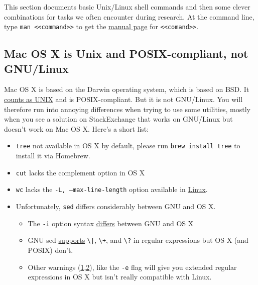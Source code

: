 \label{entry:unixshelltips}

This section documents basic Unix/Linux shell commands and then some clever combinations for tasks we often encounter during research.
At the command line, type \texttt{man <<command>>} to get the \href{https://en.wikipedia.org/wiki/Man_page}{manual page} for \texttt{<<comand>>}.

\subsection{Mac OS X is Unix and POSIX-compliant, not GNU/Linux}

Mac OS X is based on the Darwin operating system, which is based on BSD.
It \href{https://www.opengroup.org/openbrand/register/apple.htm}{counts as UNIX} and is POSIX-compliant.
But it is not GNU/Linux.
You will therefore run into annoying differences when trying to use some utilities, mostly when you see a solution on StackExchange that works on GNU/Linux but doesn't work on Mac OS X.
Here's a short list:
\begin{itemize}
\item \texttt{tree} not available in OS X by default, please run \texttt{brew install tree} to install it via Homebrew.
\item \texttt{cut} lacks the complement option in OS X
\item \texttt{wc} lacks the \texttt{-L, --max-line-length} option available in \href{https://linux.die.net/man/1/wc}{Linux}.
\item Unfortunately, \texttt{sed} differs considerably between GNU and OS X.
\begin{itemize}
	\item The \texttt{-i} option syntax \href{https://stackoverflow.com/questions/2320564/i-need-my-sed-i-command-for-in-place-editing-to-work-with-both-gnu-sed-and-bsd}{differs} between GNU and OS X
	\item GNU sed \href{https://unix.stackexchange.com/questions/13711/differences-between-sed-on-mac-osx-and-other-standard-sed}{supports} \texttt{\textbackslash|}, \texttt{\textbackslash+}, and \texttt{\textbackslash?} in regular expressions but OS X (and POSIX) don't.
	\item Other warnings (\href{https://unix.stackexchange.com/a/131940}{1},\href{https://stackoverflow.com/questions/1227174/sed-on-os-x-cant-seem-to-use-in-regexps}{2}), like the \texttt{-e} flag will give you extended regular expressions in OS X but isn't really compatible with Linux.
\end{itemize}


\end{itemize}



